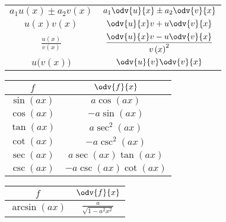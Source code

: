 \documentclass{article}
\begin{document}
\begin{appendix}
\begin{table}[H]
\begin{tabular}{c c}
            \(a_1 u\left( x \right) \pm a_2 v\left( x \right)\)           & \(\displaystyle a_1\odv{u}{x} \pm a_2\odv{v}{x}\)                         \\[8pt]
            \(u\left( x \right)v\left( x \right)\)                        & \(\displaystyle \odv{u}{x}v + u\odv{v}{x}\)                               \\[10pt]
            \(\displaystyle \frac{u\left( x \right)}{v\left( x \right)}\) & \(\displaystyle \frac{\odv{u}{x}v - u\odv{v}{x}}{{v\left( x \right)}^2}\) \\[8pt]
            \(u\bigl(v\left(x \right) \bigr)\)                            & \(\displaystyle \odv{u}{v}\odv{v}{x}\)                                    \\[5pt]
            \bottomrule
        \end{tabular}
    \end{table}
    \begin{table}[H]
        \renewcommand*{\arraystretch}{1.5}
        \centering
        \begin{tabular}{c c}
            \toprule
            \(f\)                       & \(\odv{f}{x}\)                                       \\
            \midrule
            \(\sin{\left( ax \right)}\) & \(a\cos{\left( ax \right)}\)                         \\
            \(\cos{\left( ax \right)}\) & \(-a\sin{\left( ax \right)}\)                        \\
            \(\tan{\left( ax \right)}\) & \(a\sec^2{\left( ax \right)}\)                       \\
            \(\cot{\left( ax \right)}\) & \(-a\csc^2{\left( ax \right)}\)                      \\
            \(\sec{\left( ax \right)}\) & \(a\sec{\left( ax \right)}\tan{\left( ax \right)}\)  \\
            \(\csc{\left( ax \right)}\) & \(-a\csc{\left( ax \right)}\cot{\left( ax \right)}\) \\[5pt]
            \bottomrule
        \end{tabular}
        \begin{tabular}{c c}
            \toprule
            \(f\)                          & \(\odv{f}{x}\)                                  \\
            \midrule
            \(\arcsin{\left( ax \right)}\) & \(\displaystyle  \frac{a}{\sqrt{1-a^2x^2}}\)    \\[8pt]

\end{tabular}
\end{table}
\end{appendix}
\end{document}
